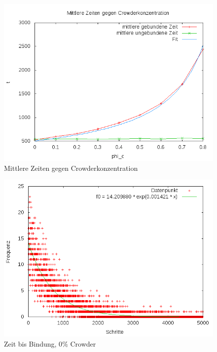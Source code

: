 \documentclass[bachelor,       %
               twoside,        %
               BCOR10mm,       %
               english,ngerman, %
               ]{GAUBM}
\begin{document}
\begin{figure}
  \centering
  \includegraphics[width=0.9\linewidth]{meantimes.png}
  \caption{Mittlere Zeiten gegen Crowderkonzentration}
  \label{fig:mean}
\end{figure}

\begin{figure}
  \centering
  \includegraphics[width=0.9\linewidth]{find0.png}
  \caption{Zeit bis Bindung, 0$\%$ Crowder}
  \label{fig:cr00}

\end{figure}
\end{document}
